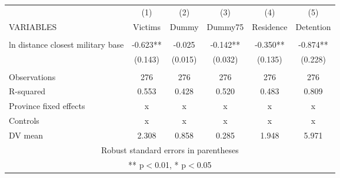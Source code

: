 \begin{tabular}{lccccc} \hline
 & (1) & (2) & (3) & (4) & (5) \\
VARIABLES & Victims & Dummy & Dummy75 & Residence & Detention \\ \hline
 &  &  &  &  &  \\
ln distance closest military base & -0.623** & -0.025 & -0.142** & -0.350** & -0.874** \\
 & (0.143) & (0.015) & (0.032) & (0.135) & (0.228) \\
 &  &  &  &  &  \\
Observations & 276 & 276 & 276 & 276 & 276 \\
R-squared & 0.553 & 0.428 & 0.520 & 0.483 & 0.809 \\
Province fixed effects & x & x & x & x & x \\
Controls & x & x & x & x & x \\
 DV mean & 2.308 & 0.858 & 0.285 & 1.948 & 5.971 \\ \hline
\multicolumn{6}{c}{ Robust standard errors in parentheses} \\
\multicolumn{6}{c}{ ** p$<$0.01, * p$<$0.05} \\
\end{tabular}
